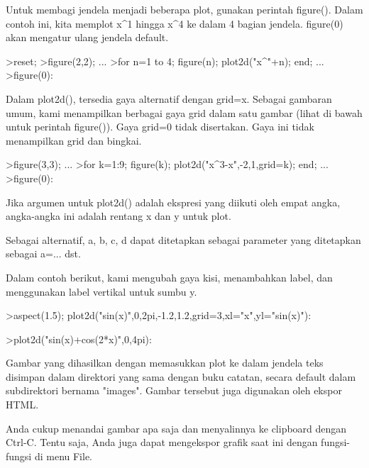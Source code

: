 \documentclass[a4paper,10pt]{article}
\begin{document}
\begin{eulernotebook}
\begin{eulercomment}
\begin{eulercomment}
\begin{eulercomment}
\begin{eulercomment}
\begin{eulercomment}
\begin{eulercomment}
\begin{eulercomment}
\begin{eulercomment}
\begin{eulercomment}
\begin{eulercomment}
\begin{eulercomment}
Untuk membagi jendela menjadi beberapa plot, gunakan perintah
figure(). Dalam contoh ini, kita memplot x\textasciicircum{}1 hingga x\textasciicircum{}4 ke dalam 4
bagian jendela. figure(0) akan mengatur ulang jendela default.
\end{eulercomment}
\begin{eulerprompt}
>reset;
>figure(2,2); ...
>for n=1 to 4; figure(n); plot2d("x^"+n); end; ...
>figure(0):
\end{eulerprompt}
\begin{eulercomment}
Dalam plot2d(), tersedia gaya alternatif dengan grid=x. Sebagai
gambaran umum, kami menampilkan berbagai gaya grid dalam satu gambar
(lihat di bawah untuk perintah figure()). Gaya grid=0 tidak
disertakan. Gaya ini tidak menampilkan grid dan bingkai.
\end{eulercomment}
\begin{eulerprompt}
>figure(3,3); ...
>for k=1:9; figure(k); plot2d("x^3-x",-2,1,grid=k); end; ...
>figure(0):
\end{eulerprompt}
\begin{eulercomment}
Jika argumen untuk plot2d() adalah ekspresi yang diikuti oleh empat
angka, angka-angka ini adalah rentang x dan y untuk plot.

Sebagai alternatif, a, b, c, d dapat ditetapkan sebagai parameter yang
ditetapkan sebagai a=... dst.

Dalam contoh berikut, kami mengubah gaya kisi, menambahkan label, dan
menggunakan label vertikal untuk sumbu y.
\end{eulercomment}
\begin{eulerprompt}
>aspect(1.5); plot2d("sin(x)",0,2pi,-1.2,1.2,grid=3,xl="x",yl="sin(x)"):
\end{eulerprompt}
\begin{eulerprompt}
>plot2d("sin(x)+cos(2*x)",0,4pi):
\end{eulerprompt}
\begin{eulercomment}
Gambar yang dihasilkan dengan memasukkan plot ke dalam jendela teks
disimpan dalam direktori yang sama dengan buku catatan, secara default
dalam subdirektori bernama "images". Gambar tersebut juga digunakan
oleh ekspor HTML.

Anda cukup menandai gambar apa saja dan menyalinnya ke clipboard
dengan Ctrl-C. Tentu saja, Anda juga dapat mengekspor  grafik saat ini
dengan fungsi-fungsi di menu File.


\end{eulercomment}
\end{eulercomment}
\end{eulercomment}
\end{eulercomment}
\end{eulercomment}
\end{eulercomment}
\end{eulercomment}
\end{eulercomment}
\end{eulercomment}
\end{eulercomment}
\end{eulercomment}
\end{eulernotebook}
\end{document}
